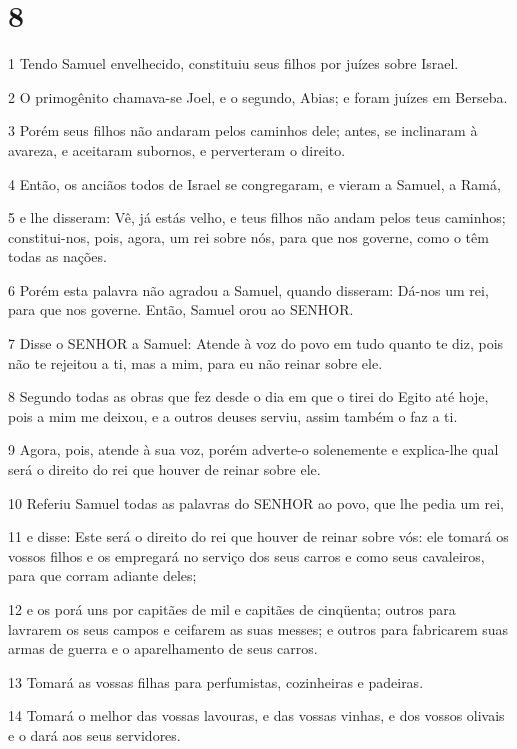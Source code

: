 \chapter{8}

\par 1 Tendo Samuel envelhecido, constituiu seus filhos por juízes sobre Israel.
\par 2 O primogênito chamava-se Joel, e o segundo, Abias; e foram juízes em Berseba.
\par 3 Porém seus filhos não andaram pelos caminhos dele; antes, se inclinaram à avareza, e aceitaram subornos, e perverteram o direito.
\par 4 Então, os anciãos todos de Israel se congregaram, e vieram a Samuel, a Ramá,
\par 5 e lhe disseram: Vê, já estás velho, e teus filhos não andam pelos teus caminhos; constitui-nos, pois, agora, um rei sobre nós, para que nos governe, como o têm todas as nações.
\par 6 Porém esta palavra não agradou a Samuel, quando disseram: Dá-nos um rei, para que nos governe. Então, Samuel orou ao SENHOR.
\par 7 Disse o SENHOR a Samuel: Atende à voz do povo em tudo quanto te diz, pois não te rejeitou a ti, mas a mim, para eu não reinar sobre ele.
\par 8 Segundo todas as obras que fez desde o dia em que o tirei do Egito até hoje, pois a mim me deixou, e a outros deuses serviu, assim também o faz a ti.
\par 9 Agora, pois, atende à sua voz, porém adverte-o solenemente e explica-lhe qual será o direito do rei que houver de reinar sobre ele.
\par 10 Referiu Samuel todas as palavras do SENHOR ao povo, que lhe pedia um rei,
\par 11 e disse: Este será o direito do rei que houver de reinar sobre vós: ele tomará os vossos filhos e os empregará no serviço dos seus carros e como seus cavaleiros, para que corram adiante deles;
\par 12 e os porá uns por capitães de mil e capitães de cinqüenta; outros para lavrarem os seus campos e ceifarem as suas messes; e outros para fabricarem suas armas de guerra e o aparelhamento de seus carros.
\par 13 Tomará as vossas filhas para perfumistas, cozinheiras e padeiras.
\par 14 Tomará o melhor das vossas lavouras, e das vossas vinhas, e dos vossos olivais e o dará aos seus servidores.

